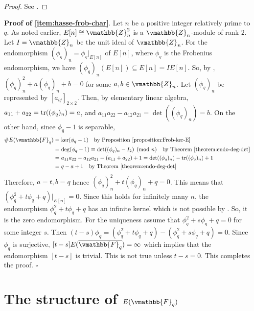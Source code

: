 \begin{proof}
See \cite[page 21]{Atiyah1969}.
\end{proof}
\textbf{Proof of \ref{item:hasse-frob-char}}. Let $n$ be a positive integer relatively prime to $q$. 
As noted earlier, $E[n] \cong \vmathbb{Z}_n^2$ is a $\vmathbb{Z}_n$-module of rank 2. Let $I = 
\vmathbb{Z}_n$ be the unit ideal of $\vmathbb{Z}_n$. For the endomorphism $(\phi_q)_n = 
\phi_q\vert_{E[n]}$ of $E[n]$, where $\phi_q$ is the Frobenius endomorphism, we have 
$(\phi_q)_n(E[n]) \subseteq E[n] = IE[n]$. So, by , $(\phi_q)_n^2 + 
a(\phi_q)_n + b = 0$ for some $a, b \in \vmathbb{Z}_n$. Let $(\phi_q)_n$ be represented by 
$[a_{ij}]_{2 \times 2}$. Then, by elementary linear algebra, $a_{11} + a_{22} = \operatorname{tr}((\phi_q)_n) = 
a$, and $a_{11}a_{22} - a_{12}a_{21} = \det((\phi_q)_n) = b$. On the other hand, since $\phi_q - 1$ 
is separable, 
\begin{align*}
\#E(\vmathbb{F}_q) &= \ker(\phi_q - 1) \quad \text{by \refproposition{proposition:Frob-ker-E}} \\
&= \deg(\phi_q - 1) \equiv \det((\phi_q)_n - I_2) \pmod n \quad \text{by 
\reftheorem{theorem:endo-deg-det}} \\
&= a_{11}a_{22} - a_{12}a_{21} - (a_{11} + a_{22}) + 1 = \det((\phi_q)_n) - \trace((\phi_q)_n) + 1 
\\
&= q - a + 1 \quad \text{by \reftheorem{theorem:endo-deg-det}}
\end{align*}
Therefore, $a = t, b = q$ hence $(\phi_q)_n^2 + t(\phi_q)_n + q = 0$. This means that $(\phi_q^2 + 
t\phi_q + q)\vert_{E[n]} = 0$. Since this holds for infinitely many $n$, the endomorphism $\phi_q^2 
+ t\phi_q + q$ has an infinite kernel which is not possible by . 
So, it is the zero endomorphism. For the uniqueness assume that $\phi_q^2 + s\phi_q + q = 0$ for 
some integer $s$. Then $(t - s)\phi_q = (\phi_q^2 + t\phi_q + q) - (\phi_q^2 + s\phi_q + q) = 0$. 
Since $\phi_q$ is surjective, $[t - s]E(\overline{\vmathbb{F}_q}) = \infty$ which implies that the 
endomorphism $[t - s]$ is trivial. This is not true unless $t - s = 0$. This completes the proof. 
\hfill $\square$









\section{The structure of $E(\vmathbb{F}_q)$}

